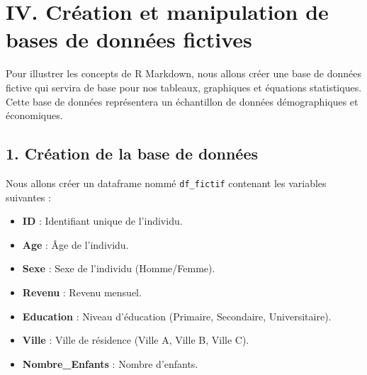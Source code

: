 \documentclass[
]{article}
\providecommand{\tightlist}{%
  \setlength{\itemsep}{0pt}\setlength{\parskip}{0pt}}
\begin{document}
\hypertarget{iv.-cruxe9ation-et-manipulation-de-bases-de-donnuxe9es-fictives}{%
\section{IV. Création et manipulation de bases de données
fictives}\label{iv.-cruxe9ation-et-manipulation-de-bases-de-donnuxe9es-fictives}}

Pour illustrer les concepts de R Markdown, nous allons créer une base de
données fictive qui servira de base pour nos tableaux, graphiques et
équations statistiques. Cette base de données représentera un
échantillon de données démographiques et économiques.

\hypertarget{cruxe9ation-de-la-base-de-donnuxe9es}{%
\subsection{1. Création de la base de
données}\label{cruxe9ation-de-la-base-de-donnuxe9es}}

Nous allons créer un dataframe nommé \texttt{df\_fictif} contenant les
variables suivantes :

\begin{itemize}
\tightlist
\item
  \textbf{ID} : Identifiant unique de l'individu.
\item
  \textbf{Age} : Âge de l'individu.
\item
  \textbf{Sexe} : Sexe de l'individu (Homme/Femme).
\item
  \textbf{Revenu} : Revenu mensuel.
\item
  \textbf{Education} : Niveau d'éducation (Primaire, Secondaire,
  Universitaire).
\item
  \textbf{Ville} : Ville de résidence (Ville A, Ville B, Ville C).
\item
  \textbf{Nombre\_Enfants} : Nombre d'enfants.
\end{itemize}
\end{document}
